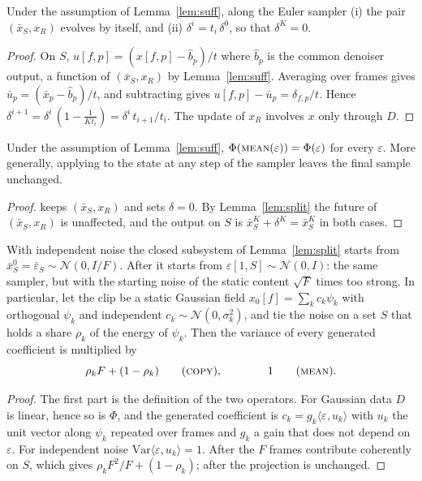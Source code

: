 \begin{lemma}\label{lem:split}
Under the assumption of Lemma~\ref{lem:suff}, along the Euler sampler
(i) the pair $(\bar x_S,x_R)$ evolves by itself, and
(ii) $\delta^{i}=t_i\,\delta^{0}$, so that $\delta^{K}=0$.
\end{lemma}
\begin{proof}
On $S$, $u[f,p]=(x[f,p]-\hat b_p)/t$ where $\hat b_p$ is the common denoiser output, a function of $(\bar x_S,x_R)$ by Lemma~\ref{lem:suff}.
Averaging over frames gives $\bar u_p=(\bar x_p-\hat b_p)/t$, and subtracting gives $u[f,p]-\bar u_p=\delta_{f,p}/t$.
Hence $\delta^{i+1}=\delta^{i}\,(1-\tfrac{1}{Kt_i})=\delta^{i}\,t_{i+1}/t_i$.
The update of $x_R$ involves $x$ only through $D$.
\end{proof}

\begin{theorem}\label{thm:mean}
Under the assumption of Lemma~\ref{lem:suff}, $\Phi(\textup{\textsc{mean}}{}(\varepsilon))=\Phi(\varepsilon)$ for every $\varepsilon$.
More generally, applying \Mean{} to the state at any step of the sampler leaves the final sample unchanged.
\end{theorem}
\begin{proof}
\Mean{} keeps $(\bar x_S,x_R)$ and sets $\delta=0$.
By Lemma~\ref{lem:split} the future of $(\bar x_S,x_R)$ is unaffected, and the output on $S$ is $\bar x_S^{K}+\delta^{K}=\bar x_S^{K}$ in both cases.
\end{proof}

\begin{theorem}\label{thm:copy}
With independent noise the closed subsystem of Lemma~\ref{lem:split} starts from $\bar x_S^{0}=\bar\varepsilon_S\sim\mathcal{N}(0,I/F)$.
After \Copy{} it starts from $\varepsilon[1,S]\sim\mathcal{N}(0,I)$: the same sampler, but with the starting noise of the static content $\sqrt F$ times too strong.
In particular, let the clip be a static Gaussian field $x_0[f]=\sum_k c_k\psi_k$ with orthogonal $\psi_k$ and independent $c_k\sim\mathcal{N}(0,\sigma_k^2)$, and tie the noise on a set $S$ that holds a share $\rho_k$ of the energy of $\psi_k$.
Then the variance of every generated coefficient is multiplied by
\begin{equation}
\rho_k F+(1-\rho_k) \qquad\text{(\textup{\textsc{copy}}{})}, \qquad\qquad 1 \qquad\text{(\textup{\textsc{mean}}{})}.
\label{eq:law}
\end{equation}
\end{theorem}
\begin{proof}
The first part is the definition of the two operators.
For Gaussian data $D$ is linear, hence so is $\Phi$, and the generated coefficient is $c_k=g_k\langle\varepsilon,u_k\rangle$ with $u_k$ the unit vector along $\psi_k$ repeated over frames and $g_k$ a gain that does not depend on $\varepsilon$.
For independent noise $\mathrm{Var}\langle\varepsilon,u_k\rangle=1$.
After \Copy{} the $F$ frames contribute coherently on $S$, which gives $\rho_kF^2/F+(1-\rho_k)$; after \Mean{} the projection is unchanged.
\end{proof}

